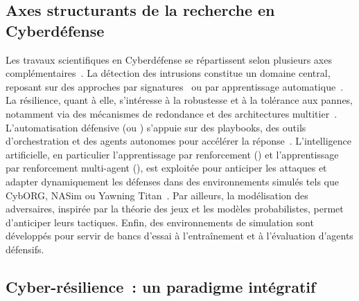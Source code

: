 

\subsection*{Axes structurants de la recherche en Cyberdéfense}

Les travaux scientifiques en Cyberdéfense se répartissent selon plusieurs axes complémentaires~\cite{Buczak2016}. La détection des intrusions constitue un domaine central, reposant sur des approches par signatures~\cite{Axelsson2000} ou par apprentissage automatique~\cite{Sommer2010,Buczak2016}. La résilience, quant à elle, s'intéresse à la robustesse et à la tolérance aux pannes, notamment via des mécanismes de redondance et des architectures multitier~\cite{Bodeau2011}. L'automatisation défensive (ou ) s'appuie sur des playbooks, des outils d'orchestration et des agents autonomes pour accélérer la réponse~\cite{Hazra2022}. L'intelligence artificielle, en particulier l'apprentissage par renforcement () et l'apprentissage par renforcement multi-agent (), est exploitée pour anticiper les attaques et adapter dynamiquement les défenses dans des environnements simulés tels que CybORG, NASim ou Yawning Titan~\cite{Standen2021, nasim2023,Andrew2022}. Par ailleurs, la modélisation des adversaires, inspirée par la théorie des jeux et les modèles probabilistes, permet d'anticiper leurs tactiques. Enfin, des environnements de simulation sont développés pour servir de bancs d'essai à l'entraînement et à l'évaluation d'agents défensifs.


\subsection*{Cyber-résilience~: un paradigme intégratif}

